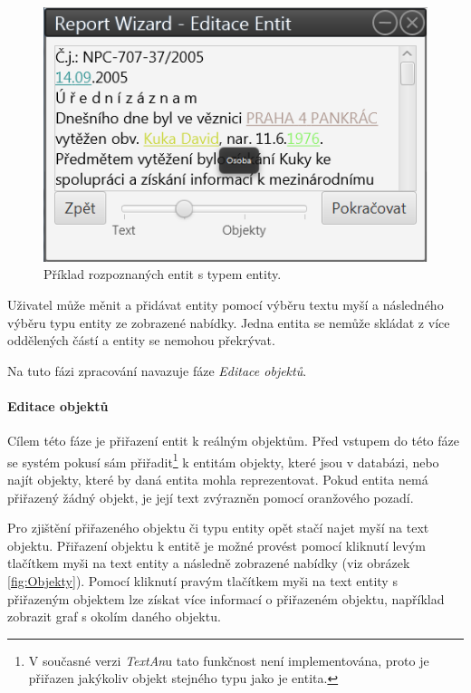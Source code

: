 \documentclass[12pt,a4paper]{report}
\newcommand{\textan}{\emph{TextAn}}
\begin{document}
\begin{figure}[!htb]
	\centering
	\includegraphics[width=\textwidth]{entity}
	\caption{Příklad rozpoznaných entit s typem entity.}
	\label{fig:Entity}
\end{figure}

Uživatel může měnit a přidávat entity pomocí výběru textu myší a následného výběru typu entity ze zobrazené nabídky. Jedna entita se nemůže skládat z více oddělených částí a entity se nemohou překrývat.

Na tuto fázi zpracování navazuje fáze \emph{Editace objektů}.

\paragraph{Editace objektů}
Cílem této fáze je přiřazení entit k reálným objektům. Před vstupem do této fáze se systém pokusí sám přiřadit\footnote{V současné verzi \textan u tato funkčnost není implementována, proto je přiřazen jakýkoliv objekt stejného typu jako je entita.} k entitám objekty, které jsou v databázi, nebo najít objekty, které by daná entita mohla reprezentovat. Pokud entita nemá přiřazený žádný objekt, je její text zvýrazněn pomocí oranžového pozadí.

Pro zjištění přiřazeného objektu či typu entity opět stačí najet myší na text objektu. Přiřazení objektu k entitě je možné provést pomocí kliknutí levým tlačítkem myši na text entity a následně zobrazené nabídky (viz obrázek \ref{fig:Objekty}). Pomocí kliknutí pravým tlačítkem myši na text entity s přiřazeným objektem lze získat více informací o přiřazeném objektu, například zobrazit graf s okolím daného objektu.
\end{document}
